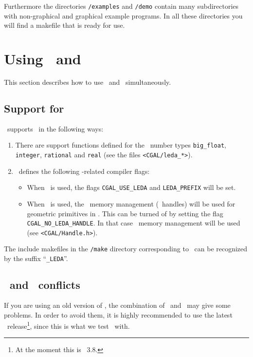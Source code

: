 Furthermore the directories \texttt{\cgaldir/examples} and
\texttt{\cgaldir/demo} contain many subdirectories with non-graphical
and graphical example programs.  In all these directories you will
find a makefile that is ready for use.

\section{Using \cgal\ and \leda}\label{sec:leda}
This section describes how to use \cgal\ and \leda\ simultaneously.

\subsection{Support for \leda}
\cgal\ supports \leda\ in the following ways:

\begin{enumerate}
\item There are support functions defined for the \leda\ number types
  \texttt{big\_float}, \texttt{integer}, \texttt{rational} and
  \texttt{real} (see the files \texttt{<CGAL/leda\_*>}).
\item \cgal\ defines the following \leda-related compiler flags:
\begin{itemize}
\item When \leda\ is used, the flags \texttt{CGAL\_USE\_LEDA} and
  \texttt{LEDA\_PREFIX} will be set.
\item When \leda\ is used, the \leda\ memory management (\leda\ handles) will be
used for geometric primitives in \cgal. This can be turned of by setting the flag
\texttt{CGAL\_NO\_LEDA\_HANDLE}. In that case \cgal\ memory management will
be used (see \texttt{<CGAL/Handle.h>}).
\end{itemize}
\end{enumerate}

The include makefiles in the \texttt{\cgaldir/make} directory
corresponding to \leda\ can be recognized by the suffix
``\texttt{\_LEDA}''.

\subsection{\leda\ and \stl\ conflicts}

If you are using an old version of \leda, the combination of \leda\ 
and \stl\ may give some problems. In order to avoid them, it is highly
recommended to use the latest \leda\ release\footnote{At the moment
  this is \leda\ 3.8.}, since this is what we test \cgal\ with.

